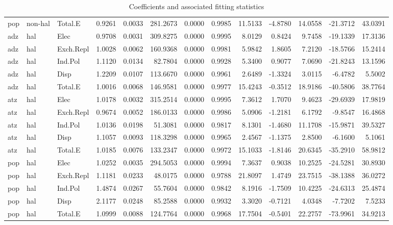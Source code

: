 \begin{table}[ht]
\begin{tabular}{lllrrrrrrrrrr}
  pop & non-hal & Total.E & 0.9261 & 0.0033 & 281.2673 & 0.0000 & 0.9985 & 11.5133 & -4.8780 & 14.0558 & -21.3712 & 43.0391 \\ 
  adz & hal & Elec & 0.9708 & 0.0031 & 309.8275 & 0.0000 & 0.9995 & 8.0129 & 0.8424 & 9.7458 & -19.1339 & 17.3136 \\ 
  adz & hal & Exch.Repl & 1.0028 & 0.0062 & 160.9368 & 0.0000 & 0.9981 & 5.9842 & 1.8605 & 7.2120 & -18.5766 & 15.2414 \\ 
  adz & hal & Ind.Pol & 1.1120 & 0.0134 & 82.7804 & 0.0000 & 0.9928 & 5.3400 & 0.9077 & 7.0690 & -21.8243 & 13.1596 \\ 
  adz & hal & Disp & 1.2209 & 0.0107 & 113.6670 & 0.0000 & 0.9961 & 2.6489 & -1.3324 & 3.0115 & -6.4782 & 5.5002 \\ 
  adz & hal & Total.E & 1.0016 & 0.0068 & 146.9581 & 0.0000 & 0.9977 & 15.4243 & -0.3512 & 18.9186 & -40.5806 & 38.7764 \\ 
  atz & hal & Elec & 1.0178 & 0.0032 & 315.2514 & 0.0000 & 0.9995 & 7.3612 & 1.7070 & 9.4623 & -29.6939 & 17.9819 \\ 
  atz & hal & Exch.Repl & 0.9674 & 0.0052 & 186.0133 & 0.0000 & 0.9986 & 5.0906 & -1.2181 & 6.1792 & -9.8547 & 16.4868 \\ 
  atz & hal & Ind.Pol & 1.0136 & 0.0198 & 51.3081 & 0.0000 & 0.9817 & 8.1301 & -1.4680 & 11.1708 & -15.9871 & 39.5327 \\ 
  atz & hal & Disp & 1.1057 & 0.0093 & 118.3298 & 0.0000 & 0.9965 & 2.4567 & -1.1375 & 2.8500 & -6.1600 & 5.1061 \\ 
  atz & hal & Total.E & 1.0185 & 0.0076 & 133.2347 & 0.0000 & 0.9972 & 15.1033 & -1.8146 & 20.6345 & -35.2910 & 58.9812 \\ 
  pop & hal & Elec & 1.0252 & 0.0035 & 294.5053 & 0.0000 & 0.9994 & 7.3637 & 0.9038 & 10.2525 & -24.5281 & 30.8930 \\ 
  pop & hal & Exch.Repl & 1.1181 & 0.0233 & 48.0175 & 0.0000 & 0.9788 & 21.8097 & 1.4749 & 23.7515 & -38.1388 & 36.0272 \\ 
  pop & hal & Ind.Pol & 1.4874 & 0.0267 & 55.7604 & 0.0000 & 0.9842 & 8.1916 & -1.7509 & 10.4225 & -24.6313 & 25.4874 \\ 
  pop & hal & Disp & 2.1177 & 0.0248 & 85.2588 & 0.0000 & 0.9932 & 3.3020 & -0.7121 & 4.0348 & -7.7202 & 7.5233 \\ 
  pop & hal & Total.E & 1.0999 & 0.0088 & 124.7764 & 0.0000 & 0.9968 & 17.7504 & -0.5401 & 22.2757 & -73.9961 & 34.9213 \\ 
   \hline
\end{tabular}
    \caption{Coefficients and associated fitting statistics \label{tab:coef_indiv}}
\end{table}


